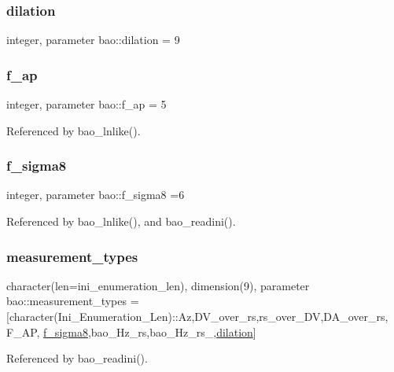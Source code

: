 \subsubsection{\texorpdfstring{dilation}{dilation}}
{\footnotesize\ttfamily integer, parameter bao\+::dilation = 9\hspace{0.3cm}{\ttfamily [private]}}

\mbox{\label{namespacebao_a90e9d6d857982260b5025f4778bf0a4d}} 
\subsubsection{\texorpdfstring{f\+\_\+ap}{f\_ap}}
{\footnotesize\ttfamily integer, parameter bao\+::f\+\_\+ap = 5\hspace{0.3cm}{\ttfamily [private]}}



Referenced by bao\+\_\+lnlike().

\mbox{\label{namespacebao_aaa65837538ed00f6c87276b81b451c45}} 
\subsubsection{\texorpdfstring{f\+\_\+sigma8}{f\_sigma8}}
{\footnotesize\ttfamily integer, parameter bao\+::f\+\_\+sigma8 =6\hspace{0.3cm}{\ttfamily [private]}}



Referenced by bao\+\_\+lnlike(), and bao\+\_\+readini().

\mbox{\label{namespacebao_a5a7cbf786aa65368c32203dfb9b72991}} 
\subsubsection{\texorpdfstring{measurement\+\_\+types}{measurement\_types}}
{\footnotesize\ttfamily character(len=ini\+\_\+enumeration\+\_\+len), dimension(9), parameter bao\+::measurement\+\_\+types = \mbox{[}character(Ini\+\_\+\+Enumeration\+\_\+\+Len)\+::\textquotesingle{}Az\textquotesingle{},\textquotesingle{}D\+V\+\_\+over\+\_\+rs\textquotesingle{},\textquotesingle{}rs\+\_\+over\+\_\+\+DV\textquotesingle{},\textquotesingle{}D\+A\+\_\+over\+\_\+rs\textquotesingle{}, \textquotesingle{}F\+\_\+\+AP\textquotesingle{}, \textquotesingle{}\mbox{\hyperlink{namespacebao_aaa65837538ed00f6c87276b81b451c45}{f\+\_\+sigma8}}\textquotesingle{},\textquotesingle{}bao\+\_\+\+Hz\+\_\+rs\textquotesingle{},\textquotesingle{}bao\+\_\+\+Hz\+\_\+rs\+\_\textquotesingle{},\textquotesingle{}\mbox{\hyperlink{namespacebao_a9bc55477c817a8204a8dd45a73ab6faa}{dilation}}\textquotesingle{}\mbox{]}\hspace{0.3cm}{\ttfamily [private]}}



Referenced by bao\+\_\+readini().

